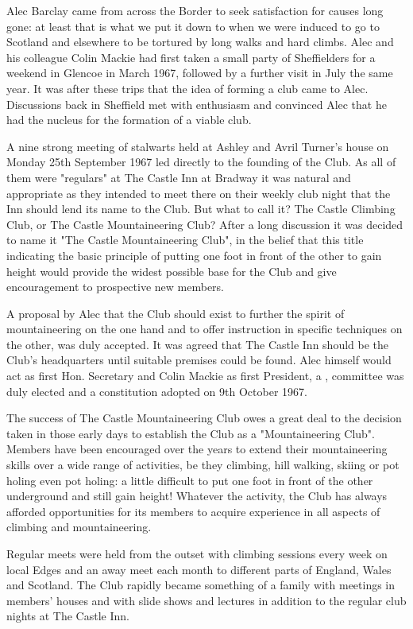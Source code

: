 \documentclass[a5paper,openany,font 10pt]{scrbook}
\begin{document}
Alec Barclay came from across the Border to seek satisfaction for
causes long gone: at least that is what we put it down to when we were
induced to go to Scotland and elsewhere to be tortured by long walks
and hard climbs. Alec and his colleague Colin Mackie had first taken a
small party of Sheffielders for a weekend in Glencoe in March 1967,
followed by a further visit in July the same year. It was after these
trips that the idea of forming a club came to Alec. Discussions back
in Sheffield met with enthusiasm and convinced Alec that he had the
nucleus for the formation of a viable club.

A nine strong meeting of stalwarts held at Ashley and Avril Turner's
house on Monday 25th September 1967 led directly to the founding of
the Club. As all of them were "regulars" at The Castle Inn at Bradway
it was natural and appropriate as they intended to meet there on their
weekly club night that the Inn should lend its name to the Club. But
what to call it? The Castle Climbing Club, or The Castle
Mountaineering Club? After a long discussion it was decided to name it
"The Castle Mountaineering Club", in the belief that this title
indicating the basic principle of putting one foot in front of the
other to gain height would provide the widest possible base for the
Club and give encouragement to prospective new members.

A proposal by Alec that the Club should exist to further the spirit of
mountaineering on the one hand and to offer instruction in specific
techniques on the other, was duly accepted. It was agreed that The
Castle Inn should be the Club's headquarters until suitable premises
could be found. Alec himself would act as first Hon. Secretary and
Colin Mackie as first President, a , committee was duly elected and a
constitution adopted on 9th October 1967.

The success of The Castle Mountaineering Club owes a great deal to the
decision taken in those early days to establish the Club as a
"Mountaineering Club". Members have been encouraged over the years to
extend their mountaineering skills over a wide range of activities, be
they climbing, hill walking, skiing or pot holing even pot holing: a
little difficult to put one foot in front of the other underground and
still gain height! Whatever the activity, the Club has always afforded
opportunities for its members to acquire experience in all aspects of
climbing and mountaineering.

Regular meets were held from the outset with climbing sessions every
week on local Edges and an away meet each month to different parts of
England, Wales and Scotland. The Club rapidly became something of a
family with meetings in members' houses and with slide shows and
lectures in addition to the regular club nights at The Castle Inn.
\end{document}
